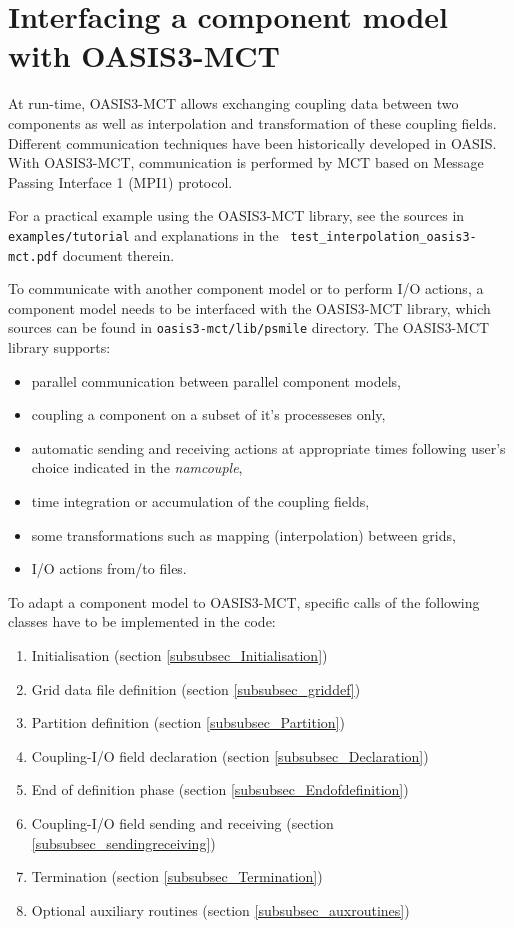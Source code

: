 \newpage
\chapter{Interfacing a component model with OASIS3-MCT}
\label{sec_modelinterfacing}

At run-time, OASIS3-MCT allows exchanging coupling data between two
components as well as interpolation and transformation of these
coupling fields. Different communication techniques have been
historically developed in OASIS. With OASIS3-MCT, communication is
performed by MCT based on Message Passing Interface 1 (MPI1) protocol.

For a practical example using the OASIS3-MCT library, see the sources
in {\tt examples/tutorial} and explanations in the {\tt
  test\_interpolation\_oasis3-mct.pdf} document therein.

To communicate with another component model or to perform I/O actions,
a component model needs to be interfaced with the OASIS3-MCT library,
which sources can be found in {\tt oasis3-mct/lib/psmile}
directory. The OASIS3-MCT library supports:

\begin{itemize}
\item parallel communication between parallel component models,
\item coupling a component on a subset of it's processeses only,
\item automatic sending and receiving actions at appropriate times
  following user's choice indicated in the {\it namcouple},
\item time integration or accumulation of the coupling fields,
\item some transformations such as mapping (interpolation) between
  grids,
\item I/O actions from/to files.
\end{itemize}

To adapt a component model to OASIS3-MCT, specific calls of the
following classes have to be implemented in the code:

\begin{enumerate}
\item Initialisation (section \ref{subsubsec_Initialisation})
\item Grid data file definition (section \ref{subsubsec_griddef})
\item Partition definition (section \ref{subsubsec_Partition})
\item Coupling-I/O field declaration (section
  \ref{subsubsec_Declaration})
\item End of definition phase (section
  \ref{subsubsec_Endofdefinition})
\item Coupling-I/O field sending and receiving (section
  \ref{subsubsec_sendingreceiving})
\item Termination (section \ref{subsubsec_Termination})
\item Optional auxiliary routines (section
  \ref{subsubsec_auxroutines})
\end{enumerate}

